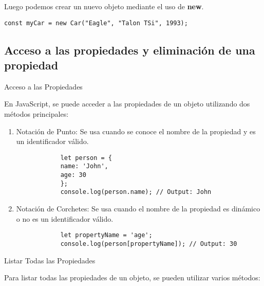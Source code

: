 \documentclass{article}
\begin{document}
Luego podemos crear un nuevo objeto mediante el uso de \textbf{new}.

\begin{lstlisting}
const myCar = new Car("Eagle", "Talon TSi", 1993);
\end{lstlisting}

\subsection{Acceso a las propiedades y eliminación de una propiedad}

Acceso a las Propiedades

En JavaScript, se puede acceder a las propiedades de un objeto utilizando dos métodos principales:

\begin{enumerate}
      \item Notación de Punto: Se usa cuando se conoce el nombre de la propiedad y es un identificador válido.
            \begin{lstlisting}
            let person = {
            name: 'John',
            age: 30
            };
            console.log(person.name); // Output: John      
            \end{lstlisting}

      \item Notación de Corchetes: Se usa cuando el nombre de la propiedad es dinámico o no es un identificador válido.
            \begin{lstlisting}
            let propertyName = 'age';
            console.log(person[propertyName]); // Output: 30            
            \end{lstlisting}

\end{enumerate}

Listar Todas las Propiedades

Para listar todas las propiedades de un objeto, se pueden utilizar varios métodos:
\end{document}
